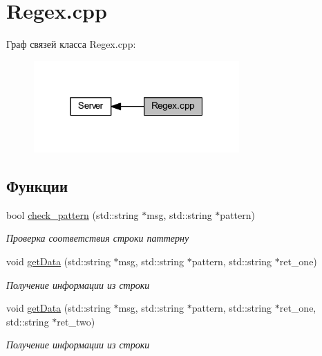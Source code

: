 \hypertarget{group__regexcpp}{}\section{Regex.\+cpp}
\label{group__regexcpp}
Граф связей класса Regex.\+cpp\+:\nopagebreak
\begin{figure}[H]
\begin{center}
\leavevmode
\includegraphics[width=223pt]{group__regexcpp}
\end{center}
\end{figure}
\subsection*{Функции}
\begin{DoxyCompactItemize}
\item 
bool \mbox{\hyperlink{group__regexcpp_gac4882c93b963bd53fd60978a9661fa30}{check\+\_\+pattern}} (std\+::string $\ast$msg, std\+::string $\ast$pattern)
\begin{DoxyCompactList}\small\item\em Проверка соответствия строки паттерну \end{DoxyCompactList}\item 
void \mbox{\hyperlink{group__regexcpp_ga524588640ff7393a801141740202d9dc}{get\+Data}} (std\+::string $\ast$msg, std\+::string $\ast$pattern, std\+::string $\ast$ret\+\_\+one)
\begin{DoxyCompactList}\small\item\em Получение информации из строки \end{DoxyCompactList}\item 
void \mbox{\hyperlink{group__regexcpp_ga0ac985b5fff36005eb80cda832582ca9}{get\+Data}} (std\+::string $\ast$msg, std\+::string $\ast$pattern, std\+::string $\ast$ret\+\_\+one, std\+::string $\ast$ret\+\_\+two)
\begin{DoxyCompactList}\small\item\em Получение информации из строки \end{DoxyCompactList}\end{DoxyCompactItemize}


